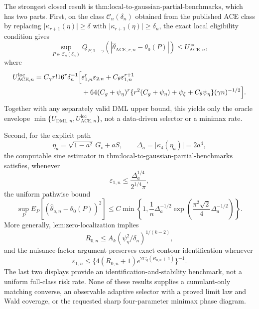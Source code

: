 The strongest closed result is \(\text{thm:local-to-gaussian-partial-benchmarks}\), which has two parts.  First, on the class \(\mathcal C_n(\delta_n)\) obtained from the published ACE class by replacing \(\lvert\kappa_{r+1}(\eta)\rvert\ge\delta\) with \(\lvert\kappa_{r+1}(\eta)\rvert\ge\delta_n\), the exact local eligibility condition gives
\[
 \sup_{P\in\mathcal C_n(\delta_n)}
 Q_{P,1-\gamma}
 \!\left(\left|\widehat\theta_{\mathrm{ACE},r,n}-\theta_0(P)\right|\right)
 \le U_{\mathrm{ACE},n}^{\mathrm{loc}},
\]
where
\[
\begin{aligned}
 U_{\mathrm{ACE},n}^{\mathrm{loc}}
 &=C_{\gamma}r!16^r\delta_n^{-1}
 \Bigl[
   \varepsilon_{1,n}^r\varepsilon_{2,n}
   +C_{\theta}\varepsilon_{1,n}^{r+1}\\
 &\hspace{24mm}
   +64(C_g+\psi_{\eta})^r
    \{r^2(C_g+\psi_{\eta})+\psi_{\xi}+C_{\theta}\psi_{\eta}\}
    (\gamma n)^{-1/2}
 \Bigr].
\end{aligned}
\]
Together with any separately valid DML upper bound, this yields only the oracle envelope \(\min\{U_{\mathrm{DML},n},U_{\mathrm{ACE},n}^{\mathrm{loc}}\}\), not a data-driven selector or a minimax rate.

Second, for the explicit path
\[
 \eta_a=\sqrt{1-a^2}\,G_{\circ}+aS,
 \qquad
 \Delta_a=\lvert\kappa_4(\eta_a)\rvert=2a^4,
\]
the computable sine estimator in \(\text{thm:local-to-gaussian-partial-benchmarks}\) satisfies, whenever
\[
 \varepsilon_{1,n}
 \le\frac{\Delta_a^{1/4}}{2^{1/4}\pi},
\]
the uniform pathwise bound
\[
 \sup_P E_P\!\left[
   (\widehat\theta_{a,n}-\theta_0(P))^2
 \right]
 \le
 C\min\!\left\{
  1,\frac{1}{n}\Delta_a^{-1/2}
  \exp\!\left(
    \frac{\pi^2\sqrt2}{4}\Delta_a^{-1/2}
  \right)
 \right\}.
\]
More generally, \(\text{lem:zero-localization}\) implies
\[
 R_{0,n}
 \le A_k(\psi_{\eta}^2/\delta_n)^{1/(k-2)},
\]
and the nuisance-factor argument preserves exact contour identification whenever
\[
 \varepsilon_{1,n}
 \le
 \{4(R_{0,n}+1)e^{2C_g(R_{0,n}+1)}\}^{-1}.
\]
The last two displays provide an identification-and-stability benchmark, not a uniform full-class risk rate.  None of these results supplies a cumulant-only matching converse, an observable adaptive selector with a proved limit law and Wald coverage, or the requested sharp four-parameter minimax phase diagram.